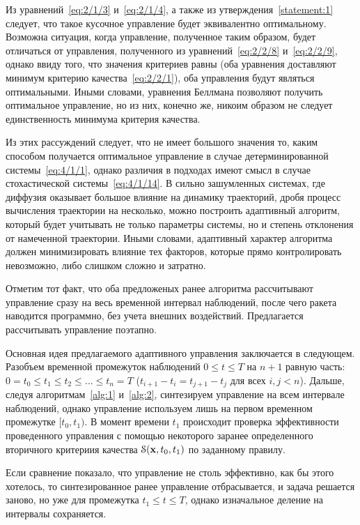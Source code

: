Из уравнений~\ref{eq:2/1/3} и~\ref{eq:2/1/4}, а также из утверждения~\vref{statement:1} следует, что такое кусочное управление будет эквивалентно оптимальному. Возможна ситуация, когда управление, полученное таким образом, будет отличаться от управления, полученного из уравнений~\ref{eq:2/2/8} и~\vref{eq:2/2/9}, однако ввиду того, что значения критериев равны (оба уравнения доставляют минимум критерию качества~\vref{eq:2/2/1}), оба управления будут являться оптимальными. Иными словами, уравнения Беллмана позволяют получить оптимальное управление, но из них, конечно же, никоим образом не следует единственность минимума критерия качества.

Из этих рассуждений следует, что не имеет большого значения то, каким способом получается оптимальное управление в случае детерминированной системы~\vref{eq:4/1/1}, однако различия в подходах имеют смысл в случае стохастической системы~\vref{eq:4/1/14}. В сильно зашумленных системах, где диффузия оказывает большое влияние на динамику траекторий, дробя процесс вычисления траектории на несколько, можно построить адаптивный алгоритм, который будет учитывать не только параметры системы, но и степень отклонения от намеченной траектории. Иными словами, адаптивный характер алгоритма должен минимизировать влияние тех факторов, которые прямо контролировать невозможно, либо слишком сложно и затратно.

Отметим тот факт, что оба предложеных ранее алгоритма рассчитывают управление сразу на весь временной интервал наблюдений, после чего ракета наводится программно, без учета внешних воздействий. Предлагается рассчитывать управление поэтапно.

\br

Основная идея предлагаемого адаптивного управления заключается в следующем. Разобъем временной промежуток наблюдений $0 \leqslant t \leqslant T$ на $n+1$ равную часть: $0 = t_0 \leqslant t_1 \leqslant t_2 \leqslant \ldots \leqslant t_{n} = T$ ($t_{i+1}-t_i = t_{j+1}-t_j$ для всех $i, j < n$). Дальше, следуя алгоритмам~\ref{alg:1} и~\ref{alg:2}, синтезируем управление на всем интервале наблюдений, однако управление используем лишь на первом временном промежутке $[t_0, t_1)$. В момент времени $t_1$ происходит проверка эффективности проведенного управления с помощью некоторого заранее определенного вторичного критериия качества $\mathcal{S}(\mathbf{x}, t_0, t_1)$ по заданному правилу.

Если сравнение показало, что управление не столь эффективно, как бы этого хотелось, то синтезированное ранее управление отбрасывается, и задача решается заново, но уже для промежутка $t_1 \leqslant t \leqslant T$, однако изначальное деление на интервалы сохраняется.

